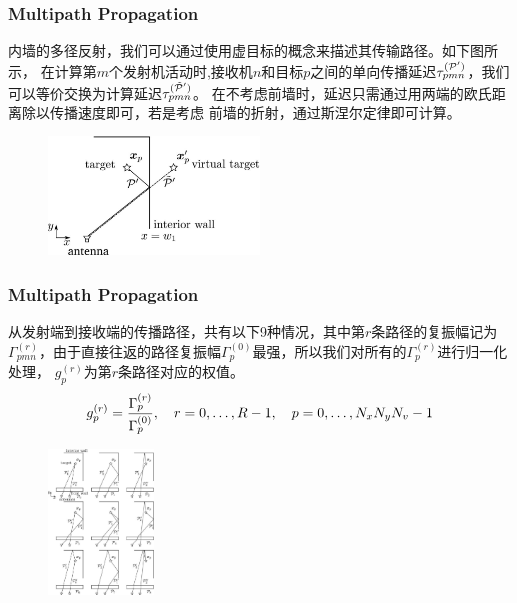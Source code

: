 \documentclass[cjk]{beamer}
\begin{document}
  \begin{frame}
	\frametitle{Multipath Propagation}
	内墙的多径反射，我们可以通过使用虚目标的概念来描述其传输路径。如下图所示，
	在计算第$m$个发射机活动时,接收机$n$和目标$p$之间的单向传播延迟$\tau_{pmn}^{({\cal P}^{\prime})}$，我们可以等价交换为计算延迟$\tau_{pmn}^{(\tilde{\cal P}^{\prime})}$。
	在不考虑前墙时，延迟只需通过用两端的欧氏距离除以传播速度即可，若是考虑
	前墙的折射，通过斯涅尔定律即可计算。
	\begin{figure}
	  \centering
	  \includegraphics[width=0.5\textwidth]{fig1.jpg}
	\end{figure}
  \end{frame}
  \begin{frame}
	\frametitle{Multipath Propagation}
	从发射端到接收端的传播路径，共有以下9种情况，其中第$r$条路径的复振幅记为
	$\Gamma_{pmn}^{(r)}$，由于直接往返的路径复振幅$\Gamma_{p}^{(0)}$最强，所以我们对所有的$\Gamma_{p}^{(r)}$进行归一化处理，
	$g_{p}^{(r)}$为第$r$条路径对应的权值。
	\begin{equation}
	  g_{p}^{(r)}={\Gamma_{p}^{(r)}\over\Gamma_{p}^{(0)}},\quad r=0,\ldots, R-1,\quad p=0,\ldots, N_{x}N_{y}N_{v}-1
	\end{equation}
	\begin{figure}
	  \centering
	  \includegraphics[width=0.25\textwidth]{fig2.jpg}
	\end{figure}
  \end{frame}
\end{document}
